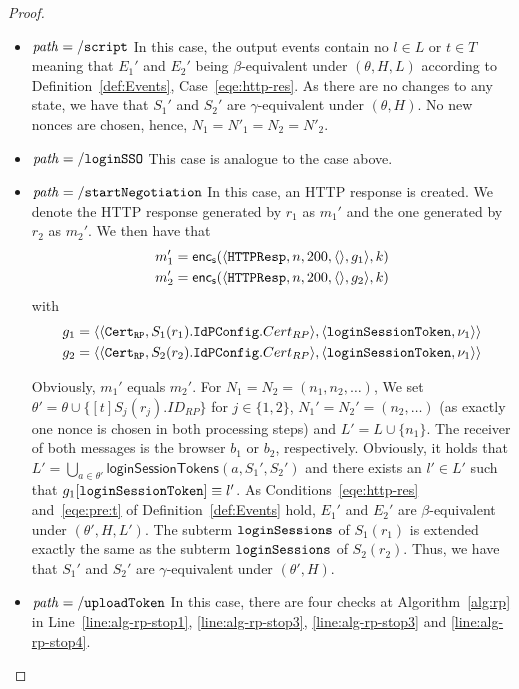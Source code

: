 \documentclass[letterpaper,onecolumn,10pt]{article}
\begin{document}
\begin{proof}
  \begin{itemize}
    \item $\mathit{path} = \mathtt{/script}$ In this case, 
      the output events contain no $l\in L$ or $t\in T$ 
      meaning that $E_1'$ and $E_2'$ being $\beta$-equivalent
      under $(\theta,H,L)$ according to 
      Definition~\ref{def:Events}, Case~\ref{eqe:http-res}. As
      there are no changes to any state, we have that $S_1'$ 
      and $S_2'$ are $\gamma$-equivalent under $(\theta,H)$. 
      No new nonces are chosen, hence, 
      $N_1 = N'_1 = N_2 = N'_2$.
    \item $\mathit{path} = \mathtt{/loginSSO}$ This case is analogue
      to the case above.
    \item $\mathit{path} = \mathtt{/startNegotiation}$ In this case, 
      an HTTP response is created. We denote the HTTP response generated by $r_1$ as $m_1'$ and the one
      generated by $r_2$ as $m_2'$. We then have that
      \begin{align*}
        m_1' = \mathsf{enc}_\mathsf{s}(\langle\mathtt{HTTPResp},n,200,\langle\rangle,g_1\rangle,k) \\
        m_2' = \mathsf{enc}_\mathsf{s}(\langle\mathtt{HTTPResp},n,200,\langle\rangle,g_2\rangle,k)
      \end{align*}
      with
      \begin{align*}
        g_1 = \langle\langle\mathtt{Cert_{RP}},S_1(r_1).\mathtt{IdPConfig}.Cert_{RP}\rangle, \langle\mathtt{loginSessionToken}, \nu_1\rangle\rangle \\
        g_2 = \langle\langle\mathtt{Cert_{RP}},S_2(r_2).\mathtt{IdPConfig}.Cert_{RP}\rangle, \langle\mathtt{loginSessionToken}, \nu_1\rangle\rangle
      \end{align*}

      Obviously, $m_1'$ equals $m_2'$. For $N_1 = N_2 = 
      (n_1, n_2, \dots)$, We set $\theta' = \theta \cup 
      \{ [t]S_j(r_j).ID_{RP} \}$ for $j\in \{1, 2\}$, 
      $N_1' = N_2' = (n_2, \dots)$ (as exactly one nonce is 
      chosen in both processing steps) and 
      $L' = L \cup \{n_1\}$. 
      The receiver of both messages is the browser $b_1$ or 
      $b_2$, respectively. Obviously, it holds that
      $L' = \bigcup_{a\in\theta'} 
      \mathsf{loginSessionTokens}(a,S_1',S_2')$
      and there exists an $l' \in L'$ such that
      $g_1[\mathtt{loginSessionToken}] \equiv l'$. As
      Conditions~\ref{eqe:http-res} and~\ref{eqe:pre:t} of
      Definition~\ref{def:Events} hold, $E_1'$ and $E_2'$ are
      $\beta$-equivalent under $(\theta',H,L')$. The subterm
      $\mathtt{loginSessions}$ of $S_1(r_1)$ is extended exactly 
      the same as the subterm $\mathtt{loginSessions}$ of 
      $S_2(r_2)$. Thus, we have that $S_1'$ and $S_2'$ are
      $\gamma$-equivalent under $(\theta',H)$.
    \item $\mathit{path} = \mathtt{/uploadToken}$ In this case, 
      there are four checks at Algorithm~\ref{alg:rp} in
      Line~\ref{line:alg-rp-stop1}, \ref{line:alg-rp-stop3}, 
      \ref{line:alg-rp-stop3} and \ref{line:alg-rp-stop4}.
      

\end{itemize}
\end{proof}
\end{document}
